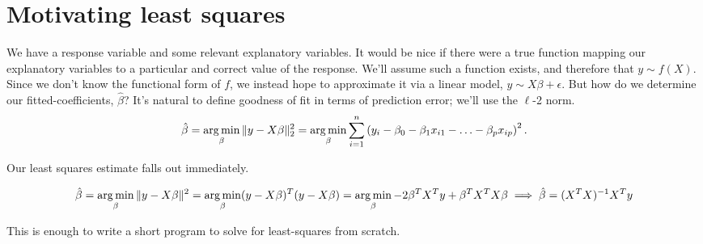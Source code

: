 \documentclass[12pt]{article}\usepackage[]{graphicx}\usepackage[]{color}
\begin{document}
\section{Motivating least squares}
We have a response variable and some relevant explanatory variables.
It would be nice if there were a true function mapping our explanatory variables
to a particular and correct value of the response. We'll assume such a function exists, and
therefore that $y \sim f(X)$. Since we don't
know the functional form of $f$, we instead hope to approximate it via a linear model,
$y \sim X\beta + \epsilon$. 
But how do we determine our fitted-coefficients, $\hat \beta$? It's natural to define
goodness of fit in terms of prediction error; we'll use the $\ell$-2 norm.
\[
  \hat \beta = \operatorname*{arg\,min}_{\beta} \| y - X \beta \|_2^2 = \operatorname*{arg\,min}_\beta \sum_{i=1}^n \left(y_i - \beta_0 - \beta_1 x_{i1} - \ldots - \beta_p x_{ip}\right)^2.
\]

Our least squares estimate falls out immediately.

\[
  \hat \beta = \operatorname*{arg\,min}_{\beta} \|y - X\beta\|^2 = \operatorname*{arg\,min}_\beta (y - X \beta)^T (y - X \beta) = \operatorname*{arg\,min}_\beta -2\beta^T X^T y + \beta^T X^T X \beta \implies \hat \beta = (X^TX)^{-1} X^T y 
\]

This is enough to write a short program to solve for least-squares from scratch. 
\end{document}
